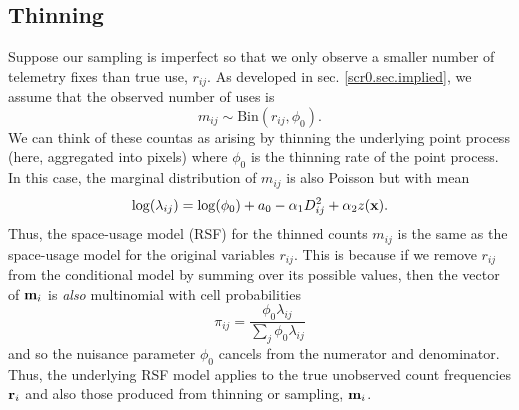 \subsection{Thinning}

Suppose our sampling is imperfect so that we only observe a smaller
number of telemetry fixes than true use, $r_{ij}$. As developed in
sec. \ref{scr0.sec.implied}, we assume that the observed number of
uses is
\[
 m_{ij} \sim \mbox{Bin}(r_{ij}, \phi_{0}).
\]
We can think of these countas as arising by thinning the underlying
point process (here, aggregated into pixels) where $\phi_{0}$ is the
thinning rate of the point process.
In this case, the marginal distribution of $m_{ij}$ is also Poisson
but with mean
\[
 \log(\lambda_{ij}) = \log(\phi_{0}) + a_{0} -\alpha_{1} D_{ij}^{2} +  \alpha_{2} z({\bf x}).
\]
Thus, the space-usage model (RSF) for the
thinned counts $m_{ij}$ is the same as the space-usage model for the
original variables $r_{ij}$.  This is because if we remove $r_{ij}$
from the conditional
 model by summing over its possible values, then the vector of
${\bf m}_{i}$ is {\it also}  multinomial with cell probabilities
\[
\pi_{ij} = \frac{\phi_{0}\lambda_{ij}}{\sum_{j} \phi_{0} \lambda_{ij}}
\]
and so the nuisance parameter $\phi_{0}$ cancels from the numerator and
denominator. Thus, the underlying RSF model applies to the true
unobserved count frequencies ${\bf r}_{i}$ and also those produced
from thinning or sampling, ${\bf m}_{i}$.


